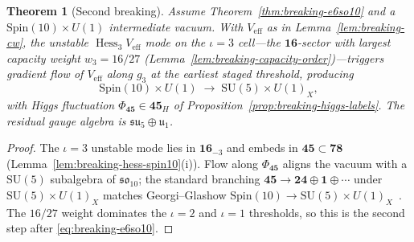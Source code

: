 \documentclass[aps,prd,onecolumn,amsmath,amssymb,nofootinbib,11pt]{revtex4-2}
\numberwithin{equation}{section}
\theoremstyle{plain}
\newtheorem{theorem}{Theorem}[section]
\theoremstyle{definition}
\theoremstyle{remark}
\newcommand{\Spin}{\mathrm{Spin}}
\newcommand{\Hess}{\operatorname{Hess}}
\begin{document}
\begin{theorem}[Second breaking]\label{thm:breaking-so10su5}
Assume Theorem~\ref{thm:breaking-e6so10} and a $\Spin(10)\times U(1)$
intermediate vacuum. With $V_{\mathrm{eff}}$ as in Lemma~\ref{lem:breaking-cw},
the unstable $\Hess_3 V_{\mathrm{eff}}$ mode on the $\iota=3$ cell---the
$\mathbf{16}$-sector with largest capacity weight $w_3=16/27$
(Lemma~\ref{lem:breaking-capacity-order})---triggers gradient flow of
$V_{\mathrm{eff}}$ along $g_3$ at the earliest staged threshold, producing
\begin{equation}\label{eq:breaking-so10su5}
  \Spin(10)\times U(1)\;\longrightarrow\;\mathrm{SU}(5)\times U(1)_X,
\end{equation}
with Higgs fluctuation $\Phi_{\mathbf{45}}\in\mathbf{45}_H$ of
Proposition~\ref{prop:breaking-higgs-labels}. The residual gauge algebra is
$\mathfrak{su}_5\oplus\mathfrak{u}_1$.
\end{theorem}

\begin{proof}
The $\iota=3$ unstable mode lies in $\mathbf{16}_{-3}$ and embeds in
$\mathbf{45}\subset\mathbf{78}$ (Lemma~\ref{lem:breaking-hess-spin10}(i)).
Flow along $\Phi_{\mathbf{45}}$ aligns the vacuum with a $\mathrm{SU}(5)$
subalgebra of $\mathfrak{so}_{10}$; the standard branching
$\mathbf{45}\to\mathbf{24}\oplus\mathbf{1}\oplus\cdots$ under
$\mathrm{SU}(5)\times U(1)_X$ matches Georgi--Glashow
$\Spin(10)\to\mathrm{SU}(5)\times U(1)_X$~\cite{GeorgiGlashow1974}. The
$16/27$ weight dominates the $\iota=2$ and $\iota=1$ thresholds, so this is
the second step after \eqref{eq:breaking-e6so10}.
\end{proof}
\end{document}
